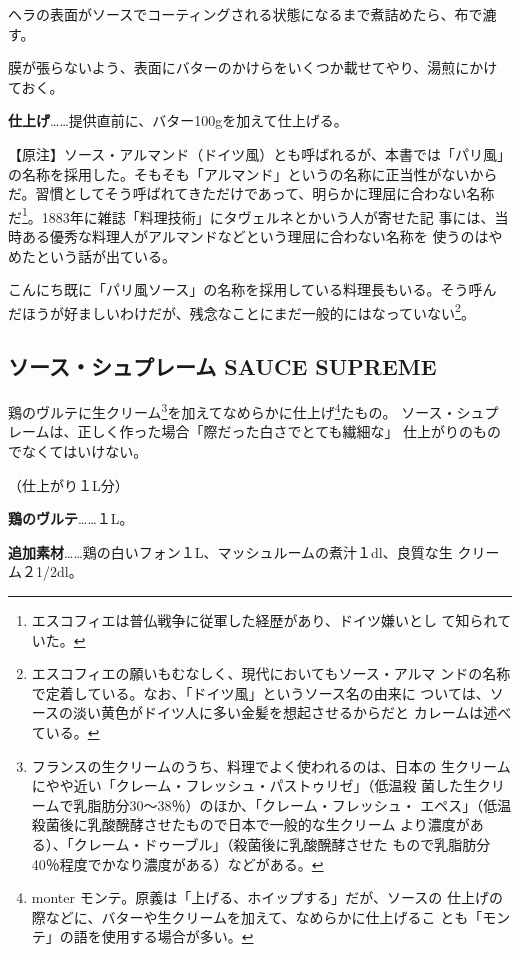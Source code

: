 \documentclass[twoside,12Q,b5paper]{escoffierltjsbook}
\begin{document}
ヘラの表面がソースでコーティングされる状態になるまで煮詰めたら、布で漉す。

膜が張らないよう、表面にバターのかけらをいくつか載せてやり、湯煎にかけ
ておく。

\textbf{仕上げ}\ldots{}\ldots{}提供直前に、バター100gを加えて仕上げる。

【原注】ソース・アルマンド（ドイツ風）とも呼ばれるが、本書では「パリ風」
の名称を採用した。そもそも「アルマンド」というの名称に正当性がないから
だ。習慣としてそう呼ばれてきただけであって、明らかに理屈に合わない名称
だ\footnote{エスコフィエは普仏戦争に従軍した経歴があり、ドイツ嫌いとし
  て知られていた。}。1883年に雑誌「料理技術」にタヴェルネとかいう人が寄せた記
事には、当時ある優秀な料理人がアルマンドなどという理屈に合わない名称を
使うのはやめたという話が出ている。

こんにち既に「パリ風ソース」の名称を採用している料理長もいる。そう呼ん
だほうが好ましいわけだが、残念なことにまだ一般的にはなっていない\footnote{エスコフィエの願いもむなしく、現代においてもソース・アルマ
  ンドの名称で定着している。なお、「ドイツ風」というソース名の由来に
  ついては、ソースの淡い黄色がドイツ人に多い金髪を想起させるからだと
  カレームは述べている。}。

\subsection{ソース・シュプレーム SAUCE
SUPREME}\label{ux30bdux30fcux30b9ux30b7ux30e5ux30d7ux30ecux30fcux30e0-sauce-supreme}

鶏のヴルテに生クリーム\footnote{フランスの生クリームのうち、料理でよく使われるのは、日本の
  生クリームにやや近い「クレーム・フレッシュ・パストゥリゼ」（低温殺
  菌した生クリームで乳脂肪分30〜38％）のほか、「クレーム・フレッシュ・
  エペス」（低温殺菌後に乳酸醗酵させたもので日本で一般的な生クリーム
  より濃度がある）、「クレーム・ドゥーブル」（殺菌後に乳酸醗酵させた
  もので乳脂肪分40％程度でかなり濃度がある）などがある。}を加えてなめらかに仕上げ\footnote{monter
  モンテ。原義は「上げる、ホイップする」だが、ソースの
  仕上げの際などに、バターや生クリームを加えて、なめらかに仕上げるこ
  とも「モンテ」の語を使用する場合が多い。}たもの。
ソース・シュプレームは、正しく作った場合「際だった白さでとても繊細な」
仕上がりのものでなくてはいけない。

（仕上がり１L分）

\textbf{鶏のヴルテ}\ldots{}\ldots{}１L。

\textbf{追加素材}\ldots{}\ldots{}鶏の白いフォン１L、マッシュルームの煮汁１dl、良質な生
クリーム２1/2dl。
\end{document}
